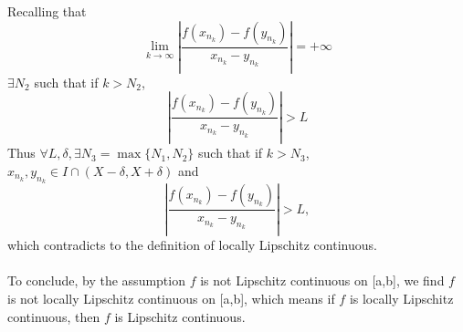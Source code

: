 \documentclass{article}
\def\to{\rightarrow}
\begin{document}
  Recalling that $$\lim_{k\to\infty} \left|\frac{f(x_{n_k})-f(y_{n_k})}
 {x_{n_k}-y_{n_k}}\right|=
 +\infty$$
 $\exists N_2$ such that if $k>N_2$,
 $$\left|\frac{f(x_{n_k})-f(y_{n_k})}{x_{n_k}-y_{n_k}}\right|>L$$
 Thus $\forall L,\delta,\exists N_3=\max\{N_1,N_2\}$ 
 such that if $k>N_3$, $ x_{n_k},y_{n_k}\in I\cap (X-\delta,X+\delta)$ and
 $$\left|\frac{f(x_{n_k})-f(y_{n_k})}{x_{n_k}-y_{n_k}}\right|>L,$$ 
  which contradicts to the definition of locally Lipschitz continuous.\\ \ \\
  To conclude, by the assumption $f$ is not Lipschitz continuous on [a,b], we find
  $f$ is not locally Lipschitz continuous on [a,b], which means 
  if $f$ is locally Lipschitz continuous, then $f$ is Lipschitz continuous.
\end{document}
